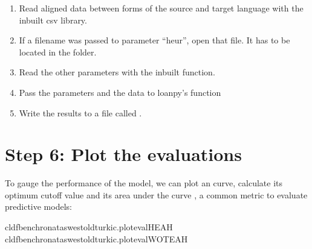 \documentclass[letterpaper,10pt,english]{sphinxmanual}
\begin{document}
\begin{fulllineitems}
\label{\detokenize{mkloanpy:ronataswestoldturkiccommands.evalsc.run}}
\pysigstartsignatures
{}
\pysigstopsignatures\begin{enumerate}
%
\item {} 
\sphinxAtStartPar
Read aligned data between forms of the source and target language
with the inbuilt csv library.

\item {} 
\sphinxAtStartPar
If a filename was passed to parameter “heur”, open that file. It has
to be located in the  folder.

\item {} 
\sphinxAtStartPar
Read the other parameters with the inbuilt  function.

\item {} 
\sphinxAtStartPar
Pass the parameters and the data to loanpy’s 
function

\item {} 
\sphinxAtStartPar
Write the results to a file called .

\end{enumerate}

\end{fulllineitems}



\section{Step 6: Plot the evaluations}
\label{\detokenize{mkloanpy:step-6-plot-the-evaluations}}
\sphinxAtStartPar
To gauge the performance of the model, we can plot an  curve,
calculate its optimum cut\sphinxhyphen{}off value and its area under the curve ,
a common metric to evaluate predictive models:

\begin{sphinxVerbatim}[commandchars=\\\{\}]
cldfbenchronataswestoldturkic.plot\PYGZus{}evalHEAH
cldfbenchronataswestoldturkic.plot\PYGZus{}evalWOTEAH
\end{sphinxVerbatim}
\end{document}
